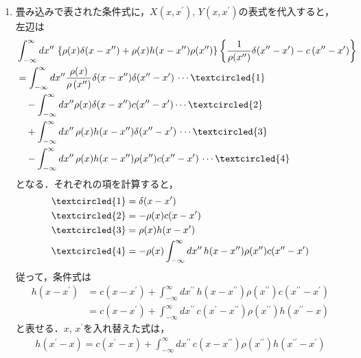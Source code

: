 \documentclass[11pt,a4]{jsarticle}
\numberwithin{equation}{section}
\begin{document}
\begin{enumerate}[(1)]
  \item
畳み込みで表された条件式に，$X\left(x,x^{\prime}\right)$, $Y\left(x,x^{\prime}\right)$の表式を代入すると，
左辺は
\begin{align*}
 &\int_{-\infty}^{\infty} dx^{\prime\prime}\,\left\{\rho(x)\delta(x-x^{\prime\prime})+\rho(x)h(x-x^{\prime\prime})\rho(x^{\prime\prime})\right\}\left\{\dfrac{1}{\rho(x^{\prime\prime})}\delta(x^{\prime\prime}-x^{\prime}) - c\left(x^{\prime\prime}-x^{\prime}\right)\right\} \notag \\
 & = \int_{-\infty}^{\infty}dx^{\prime\prime} \dfrac{\rho(x)}{\rho\left(x^{\prime\prime}\right)}\delta(x-x^{\prime\prime})\delta(x^{\prime\prime}-x^{\prime}) \,\cdots \textcircled{1}\notag \\ 
 & \quad - \int_{-\infty}^{\infty}dx^{\prime\prime}\rho(x)\delta(x-x^{\prime\prime})c(x^{\prime\prime}-x^{\prime}) 
 \cdots \textcircled{2}\notag \\
 & \quad +\int_{-\infty}^{\infty}dx^{\prime\prime}\,\rho(x)h(x-x^{\prime\prime})\delta(x^{\prime\prime}-x^{\prime})\,\cdots \textcircled{3} \notag \\
 & \quad -\int_{-\infty}^{\infty}dx^{\prime\prime}\,\rho(x)h(x-x^{\prime\prime})\rho(x^{\prime\prime})c(x^{\prime\prime}-x^{\prime}) \,\cdots \textcircled{4}
\end{align*}
となる．それぞれの項を計算すると，
\begin{align*}
 \textcircled{1} &= \delta(x-x^{\prime}) \\
 \textcircled{2} &= -\rho(x)c(x-x^{\prime}) \\
 \textcircled{3} &= \rho(x)h(x-x^{\prime}) \\
 \textcircled{4} &= -\rho(x)\int_{-\infty}^{\infty}dx^{\prime\prime}\,h(x-x^{\prime\prime})\rho(x^{\prime\prime})c(x^{\prime\prime}-x^{\prime})
\end{align*}
従って，条件式は
\begin{align*}
 h(x-x^{\prime}) &= c(x-x^{\prime}) + \int_{-\infty}^{\infty}dx^{\prime\prime}\,
                   h(x-x^{\prime\prime})\rho(x^{\prime\prime})c(x^{\prime\prime}-x^{\prime}) \\
                 &= c(x-x^{\prime}) + \int_{-\infty}^{\infty}dx^{\prime\prime}\, c(x^{\prime}-x^{\prime\prime})\rho(x^{\prime\prime})h(x^{\prime\prime}-x)
\end{align*}
と表せる．$x$, $x^{\prime}$を入れ替えた式は，
\begin{align*}
  h(x^\prime -x) = c(x^\prime - x) + \int_{-\infty}^{\infty}dx^{\prime\prime}\,c(x-x^{\prime\prime})\rho(x^{\prime\prime})h(x^{\prime\prime}-x^{\prime}) 

\end{align*}
\end{enumerate}
\end{document}
